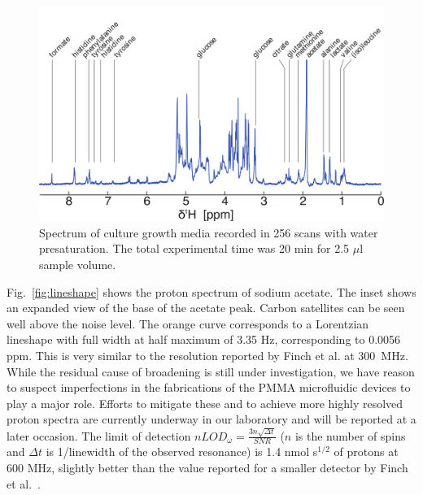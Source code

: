 \documentclass[preprint,5p]{elsarticle}
\newcommand{\fig}[1]{Fig.~\ref{#1}}
\begin{document}
\begin{figure}
\centering
\includegraphics[width=\linewidth,keepaspectratio=true]{./figures/media-180125-005-bigger-font.png}
\caption{Spectrum of culture growth media recorded in 256 scans with water presaturation. The total experimental time was 20 min for 2.5 $\mu$l sample volume.}
\label{fig:media-spec}
\end{figure}
\cbdelete
\fig{fig:lineshape} shows the proton spectrum of sodium acetate. The inset shows an expanded view of the base of the acetate peak. Carbon satellites can be seen well above the noise level. The orange curve
corresponds to a Lorentzian lineshape with full width at half maximum of 3.35
Hz, corresponding to 0.0056 ppm. This is very similar to the resolution reported
by Finch et al. at 300~MHz. While the residual cause of broadening is still
under investigation, we have reason to suspect imperfections in the fabrications
of the PMMA microfluidic devices to play a major role. Efforts to mitigate these
and to achieve more highly resolved proton spectra are currently underway in our
laboratory and will be reported at a later occasion.  The limit of detection
$nLOD_{\omega}=\frac{3n\sqrt{{\Delta}t}}{SNR}$ ($n$ is the number of spins and
$\Delta t$ is 1/linewidth of the observed resonance) is 1.4 nmol s$^{1/2}$ of
protons at 600 MHz, slightly better than the value reported for a smaller
detector by Finch et al.~\cite{gream_2016}.
\end{document}
